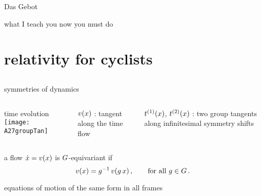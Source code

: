 \begin{frame}{\Large Das Gebot}
\begin{block}{}
    {\large
what I teach you now you must do
    }
\end{block}
\end{frame}

\section[relativity for cyclists]{relativity for cyclists}

\subsection[in/equivariance]{}

\begin{frame}{symmetries of dynamics}
  \begin{columns}
\begin{block}{time evolution}
\texttt{[image: A27groupTan]}
\end{block}
$v(x)$ : tangent along the time flow

\bigskip

$t^{(1)}(x)$, $t^{(2)}(x)$ : two group tangents
along infinitesimal symmetry shifts
	\end{columns}

\bigskip

\begin{block}{a flow $\dot{x}= v(x)$ is $G$-equivariant if}
\[
v(x)=g^{-1} \, v(g \, x)
\,,\qquad \mbox{for all } g \in {\ensuremath{G}}
\,.
\] %

\end{block}

\bigskip

equations of motion of the same form in all frames
\end{frame}

